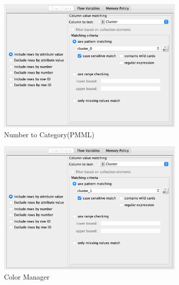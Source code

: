 \documentclass[11pt]{article}
\begin{document}
			\begin{figure}[H]
				\centering
				\begin{subfigure}{0.4\textwidth}
					\includegraphics[width=\textwidth]{res/t1/t14/t14-row-filter-1-conf}
					\caption{Number to Category(PMML)}
					\label{fig:first}
				\end{subfigure}
				\hfill
				\begin{subfigure}{0.4\textwidth}
					\includegraphics[width=\textwidth]{res/t1/t14/t14-row-filter-2-conf}
					\caption{Color Manager}
					\label{fig:second}
				\end{subfigure}
				\hfill
				\begin{subfigure}{0.4\textwidth}

\end{subfigure}
\end{figure}
\end{document}
